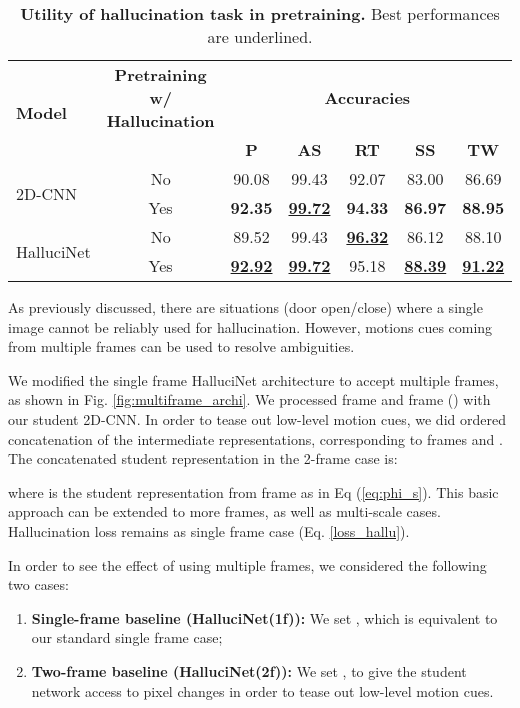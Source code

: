 \documentclass[10pt,twocolumn,letterpaper]{article}
\begin{document}
%
 {\setlength{\tabcolsep}{4pt}
\begin{table}
\centering
\small
\begin{tabular}{@{}lcccccc@{}}
\toprule
\multirow{2}{*}{\textbf{Model}} &
\multirowcell{2}{\textbf{\footnotesize{Pretraining w/}}\\\textbf{\footnotesize{Hallucination}}} &
  \multicolumn{5}{c}{\textbf{Accuracies}} \\ \cmidrule(l){3-7} 
                                 &                   & \textbf{P}     & \textbf{AS}    & \textbf{RT}    & \textbf{SS}    & \textbf{TW}    \\ \midrule
\multirow{2}{*}{2D-CNN}     & No & 90.08          & 99.43          & 92.07          & 83.00          & 86.69          \\ & Yes  & \textbf{92.35} & \underline{\textbf{99.72}} & \textbf{94.33} & \textbf{86.97} & \textbf{88.95} \\ \midrule
\multirow{2}{*}{HalluciNet} & No & 89.52          & 99.43          & \underline{\textbf{96.32}}          & 86.12          & 88.10          \\ &
  Yes &
  \underline{\textbf{92.92}} &
  \underline{\textbf{99.72}} &
  {95.18} &
  \underline{\textbf{88.39}} &
  \underline{\textbf{91.22}} \\ \bottomrule
\end{tabular}
\caption{\textbf{Utility of hallucination task in pretraining.} Best performances are underlined.}
\label{tab:hallucination_pretraining}
\end{table}}
%
 As previously discussed, there are situations (\eg door open/close) where a single image cannot be reliably used for hallucination.  However, motions cues coming from multiple frames can be used to resolve ambiguities. 

We modified the single frame HalluciNet architecture to accept multiple frames, as shown in Fig. \ref{fig:multiframe_archi}. We processed frame  and frame  () with our student 2D-CNN. In order to tease out low-level motion cues, we did ordered concatenation of the intermediate representations, corresponding to frames  and . The concatenated student representation in the 2-frame case is: 

where  is the student representation from frame  as in Eq (\ref{eq:phi_s}).  This basic approach can be extended to more frames, as well as multi-scale cases. Hallucination loss remains as single frame case (Eq. \ref{loss_hallu}).

In order to see the effect of using multiple frames, we considered the following two cases:  
\begin{enumerate}[noitemsep]
\item \textbf{Single-frame baseline (HalluciNet(1f)):} We set , which is equivalent to our standard single frame case;
\item \textbf{Two-frame baseline (HalluciNet(2f)):} We set , to give the student network  access to pixel changes in order to tease out low-level motion cues.
\end{enumerate}
\end{document}
